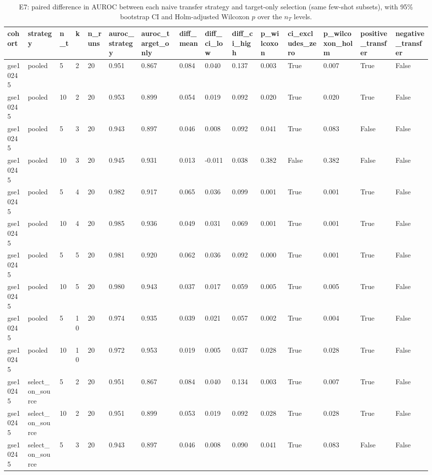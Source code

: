 \begin{table}[t]
  \centering
  \caption{E7: paired difference in AUROC between each naive transfer strategy and target-only selection (same few-shot subsets), with 95\% bootstrap CI and Holm-adjusted Wilcoxon $p$ over the $n_T$ levels.}
  \label{tab:e7}
  \small
  \begin{tabular}{lllllllllllllll}
    \toprule
    cohort & strategy & n\_t & k & n\_runs & auroc\_strategy & auroc\_target\_only & diff\_mean & diff\_ci\_low & diff\_ci\_high & p\_wilcoxon & ci\_excludes\_zero & p\_wilcoxon\_holm & positive\_transfer & negative\_transfer \\
    \midrule
    gse10245 & pooled & 5 & 2 & 20 & 0.951 & 0.867 & 0.084 & 0.040 & 0.137 & 0.003 & True & 0.007 & True & False \\
    gse10245 & pooled & 10 & 2 & 20 & 0.953 & 0.899 & 0.054 & 0.019 & 0.092 & 0.020 & True & 0.020 & True & False \\
    gse10245 & pooled & 5 & 3 & 20 & 0.943 & 0.897 & 0.046 & 0.008 & 0.092 & 0.041 & True & 0.083 & False & False \\
    gse10245 & pooled & 10 & 3 & 20 & 0.945 & 0.931 & 0.013 & -0.011 & 0.038 & 0.382 & False & 0.382 & False & False \\
    gse10245 & pooled & 5 & 4 & 20 & 0.982 & 0.917 & 0.065 & 0.036 & 0.099 & 0.001 & True & 0.001 & True & False \\
    gse10245 & pooled & 10 & 4 & 20 & 0.985 & 0.936 & 0.049 & 0.031 & 0.069 & 0.001 & True & 0.001 & True & False \\
    gse10245 & pooled & 5 & 5 & 20 & 0.981 & 0.920 & 0.062 & 0.036 & 0.092 & 0.000 & True & 0.001 & True & False \\
    gse10245 & pooled & 10 & 5 & 20 & 0.980 & 0.943 & 0.037 & 0.017 & 0.059 & 0.005 & True & 0.005 & True & False \\
    gse10245 & pooled & 5 & 10 & 20 & 0.974 & 0.935 & 0.039 & 0.021 & 0.057 & 0.002 & True & 0.004 & True & False \\
    gse10245 & pooled & 10 & 10 & 20 & 0.972 & 0.953 & 0.019 & 0.005 & 0.037 & 0.028 & True & 0.028 & True & False \\
    gse10245 & select\_on\_source & 5 & 2 & 20 & 0.951 & 0.867 & 0.084 & 0.040 & 0.134 & 0.003 & True & 0.007 & True & False \\
    gse10245 & select\_on\_source & 10 & 2 & 20 & 0.951 & 0.899 & 0.053 & 0.019 & 0.092 & 0.028 & True & 0.028 & True & False \\
    gse10245 & select\_on\_source & 5 & 3 & 20 & 0.943 & 0.897 & 0.046 & 0.008 & 0.090 & 0.041 & True & 0.083 & False & False \\

\end{tabular}
\end{table}
